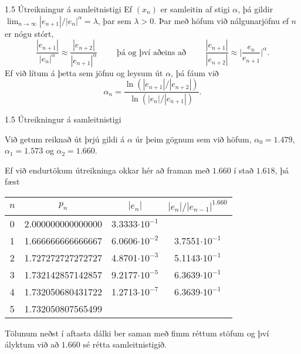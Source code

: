%
\begin{frame}{1.5 Útreikningur á samleitnistigi} 
Ef $(x_n)$ er samleitin af stigi $\alpha$, þá gildir
$\lim_{n\to \infty}|e_{n+1}|/|e_n|^\alpha=\lambda$, þar sem
$\lambda>0$. Þar með höfum við nálgunarjöfnu ef $n$ er nógu stórt,
\begin{equation*}
    \dfrac{|e_{n+1}|}{|e_n|^\alpha} \approx
    \dfrac{|e_{n+2}|}{|e_{n+1}|^\alpha}
    \qquad \text{ þá og því aðeins að } \qquad 
    \dfrac{|e_{n+1}|}{|e_{n+2}|} \approx
    \bigg|\dfrac{e_{n}}{e_{n+1}} \bigg|^\alpha.
\end{equation*}\pause
Ef við lítum á þetta sem jöfnu og leysum út $\alpha$, þá fáum við
\begin{equation*}
    \alpha_n = 
    \dfrac{\ln(|e_{n+1}|/|e_{n+2}|)}{\ln(|e_{n}|/|e_{n+1}|)}.
\end{equation*}
\end{frame}
%

%
\begin{frame}{1.5 Útreikningur á samleitnistigi} 

Við getum reiknað út þrjú gildi á $\alpha$  úr þeim gögnum sem við
höfum, $\alpha_0= 1.479$, $\alpha_1 = 1.573$ og $\alpha_2=1.660$. \pause 

Ef við endurtökum útreikninga okkar hér að framan með $1.660$ í stað
$1.618$, þá fæst  

\begin{center}
\begin{tabular}{c|c|c|c|}
$n$ & $p_n$ & $|e_n|$ & $|e_n|/|e_{n-1}|^{1.660}$ \\  \hline 
0&  2.000000000000000 & 3.3333$\cdot 10^{-1}$ &\\
1&  1.666666666666667 & 6.0606$\cdot 10^{-2}$ & 3.7551$\cdot 10^{-1}$\\
2&  1.727272727272727 & 4.8701$\cdot 10^{-3}$ & 5.1143$\cdot 10^{-1}$\\
3&  1.732142857142857 & 9.2177$\cdot 10^{-5}$ & 6.3639$\cdot 10^{-1}$\\
4&  1.732050680431722 & 1.2713$\cdot 10^{-7}$ & 6.3639$\cdot 10^{-1}$\\
5&  1.732050807565499 & &\\
\end{tabular}
\end{center}
Tölunum neðst í aftasta dálki ber saman með fimm réttum stöfum og því
ályktum við að $1.660$ sé rétta samleitnistigið.  
\end{frame}



